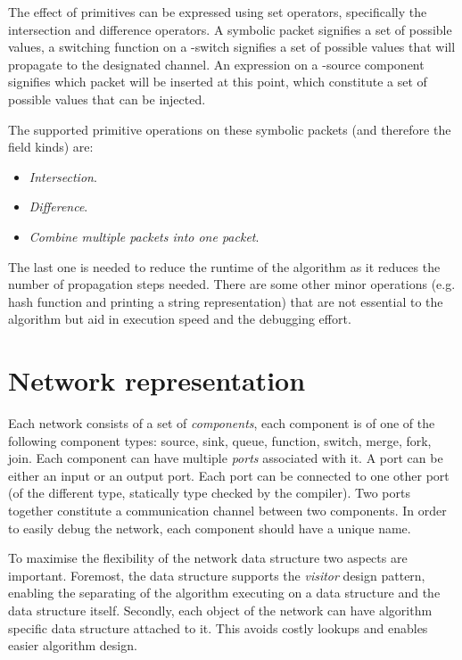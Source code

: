 \documentclass[a4paper]{article}
\begin{document}
The effect of \xmas primitives can be expressed using set operators, specifically the intersection and difference operators. A symbolic packet signifies a set of possible values, a switching function on a \xmas-switch signifies a set of possible values that will propagate to the designated channel. An expression on a \xmas-source component signifies which packet will be inserted at this point, which constitute a set of possible values that can be injected.

The supported primitive operations on these symbolic packets (and therefore the field kinds) are:
\begin{itemize}
\item \emph{Intersection}. 
\item \emph{Difference}.
\item \emph{Combine multiple packets into one packet}.
\end{itemize}

The last one is needed to reduce the runtime of the algorithm as it reduces the number of propagation steps needed. There are some other minor operations (e.g. hash function and printing a string representation) that are not essential to the algorithm but aid in execution speed and the debugging effort.


\section{Network representation}
Each network consists of a set of \emph{components}, each component is of one of the following component types: source, sink, queue, function, switch, merge, fork, join. Each component can have multiple \emph{ports} associated with it. A port can be either an input or an output port. Each port can be connected to one other port (of the different type, statically type checked by the compiler). Two ports together constitute a communication channel between two components. In order to easily debug the network, each component should have a unique name.

To maximise the flexibility of the network data structure two aspects are important. Foremost, the data structure supports the \emph{visitor} design pattern, enabling the separating of the algorithm executing on a data structure and the data structure itself. Secondly, each object of the network can have algorithm specific data structure attached to it. This avoids costly lookups and enables easier algorithm design.
\end{document}
